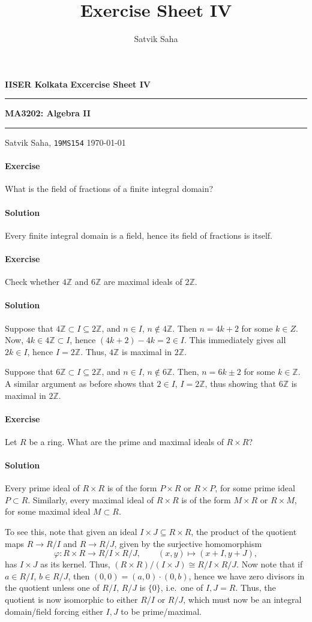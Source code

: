 \documentclass[10pt]{article}
\title{Exercise Sheet IV}
\author{Satvik Saha}
\date{}
\newcounter{prob}
\newcommand{\problem}{\stepcounter{prob}\paragraph{Exercise \arabic{prob}}}
\newcommand{\solution}{\paragraph{Solution}}
\newcommand{\Z}{\mathbb{Z}}
\begin{document}
    \noindent\textbf{IISER Kolkata} \hfill \textbf{Excercise Sheet IV}
    \vspace{3pt}
    \hrule
    \vspace{3pt}
    \begin{center}
    \LARGE{\textbf{MA3202: Algebra II}}
    \end{center}
    \vspace{3pt}
    \hrule
    \vspace{3pt}
    Satvik Saha, \texttt{19MS154} \hfill \today
    \vspace{20pt}

    
    \problem What is the field of fractions of a finite integral domain?

    \solution Every finite integral domain is a field, hence its field of fractions
    is itself.


    \problem Check whether $4\Z$ and $6\Z$ are maximal ideals of $2\Z$.

    \solution Suppose that $4\Z \subset I \subseteq 2\Z$, and $n \in I$, $n \notin
    4\Z$. Then $n = 4k + 2$ for some $k \in Z$. Now, $4k \in 4\Z \subset I$, hence
    $(4k + 2) - 4k = 2 \in I$. This immediately gives all $2k \in I$, hence $I =
    2\Z$. Thus, $4\Z$ is maximal in $2\Z$.

    Suppose that $6\Z \subset I \subseteq 2\Z$, and $n \in I$, $n \notin 6\Z$. Then,
    $n = 6k \pm 2$ for some $k \in \Z$. A similar argument as before shows that $2
    \in I$, $I = 2\Z$, thus showing that $6\Z$ is maximal in $2\Z$.


    \problem Let $R$ be a ring. What are the prime and maximal ideals of $R\times R$?

    \solution Every prime ideal of $R\times R$ is of the form $P\times R$ or $R\times
    P$, for some prime ideal $P \subset R$. Similarly, every maximal ideal of
    $R\times R$ is of the form $M\times R$ or $R\times M$, for some maximal ideal $M
    \subset R$.

    To see this, note that given an ideal $I\times J \subseteq R \times R$, the
    product of the quotient maps $R \to R/I$ and $R \to R/J$, given by the surjective
    homomorphism \[
        \varphi\colon R\times R \to R/I \times R/J, \qquad (x, y) \mapsto (x + I, y +
        J),
    \] has $I\times J$ as its kernel. Thus, $(R\times R)/(I \times J) \cong R/I
    \times R/J$. Now note that if $a \in R/I$, $b \in R/J$, then $(0, 0) = (a,
    0)\cdot (0, b)$, hence we have zero divisors in the quotient unless one of $R/I$,
    $R/J$ is $\{0\}$, i.e.\ one of $I, J = R$. Thus, the quotient is now isomorphic
    to either $R/I$ or $R/J$, which must now be an integral domain/field forcing
    either $I, J$ to be prime/maximal.
\end{document}
